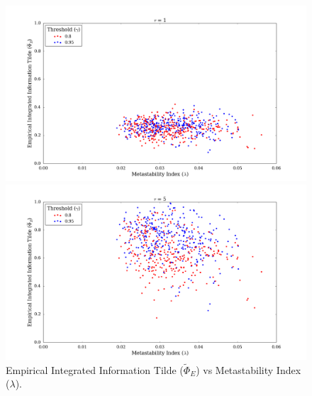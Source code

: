 \documentclass[a4paper,11pt]{article}
\begin{document}
\begin{figure}[H] 
	\begin{minipage}[b]{0.5\linewidth}
		\begin{center}
		\includegraphics[scale = 0.2]{figures/snn/phi_tilde_vs_lambda_1}
		\end{center}
		\vspace{4ex}
	\end{minipage}
	\begin{minipage}[b]{0.5\linewidth}
		\begin{center}
		\includegraphics[scale = 0.2]{figures/snn/phi_tilde_vs_lambda_5}
		\end{center}
		\vspace{4ex}
	\end{minipage}
	\caption{
		Empirical Integrated Information Tilde ($\widetilde{\Phi}_E$) vs Metastability Index ($\lambda$).
		\label{fig:phi_tilde_vs_lambda}
	}
\end{figure}

\end{document}
